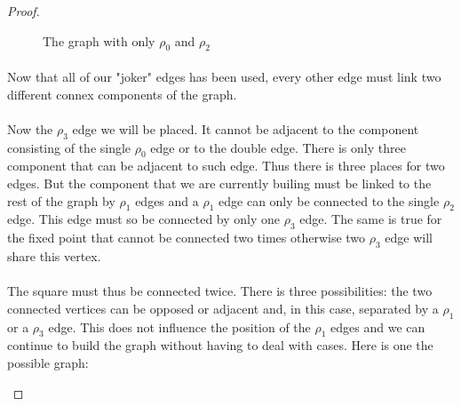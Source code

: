 \begin{proof}
\begin{figure}[H]
\begin{center}
\begin{tikzpicture}[scale=.8]
    \end{tikzpicture}
    \caption{The graph with only $\rho_0$ and $\rho_2$}
  \end{center}
\end{figure}

\paragraph{}
Now that all of our "joker" edges has been used, every other edge must link two different connex components of the graph.

\paragraph{}
Now the $\rho_3$ edge we will be placed. It cannot be adjacent to the component consisting of the single $\rho_0$ edge or to the double edge. There is only three component that can be adjacent to such edge. Thus there is three places for two edges. But the component that we are currently builing must be linked to the rest of the graph by $\rho_1$ edges and a $\rho_1$ edge can only be connected to the single $\rho_2$ edge. This edge must so be connected by only one $\rho_3$ edge. The same is true for the fixed point that cannot be connected two times otherwise two $\rho_3$ edge will share this vertex.

\paragraph{}
The square must thus be connected twice. There is three possibilities: the two connected vertices can be opposed or adjacent and, in this case, separated by a $\rho_1$ or a $\rho_3$ edge. This does not influence the position of the $\rho_1$ edges and we can continue to build the graph without having to deal with cases. Here is one the possible graph:

\begin{figure}[H]
  \begin{center}
\end{center}
\end{figure}
\end{proof}
